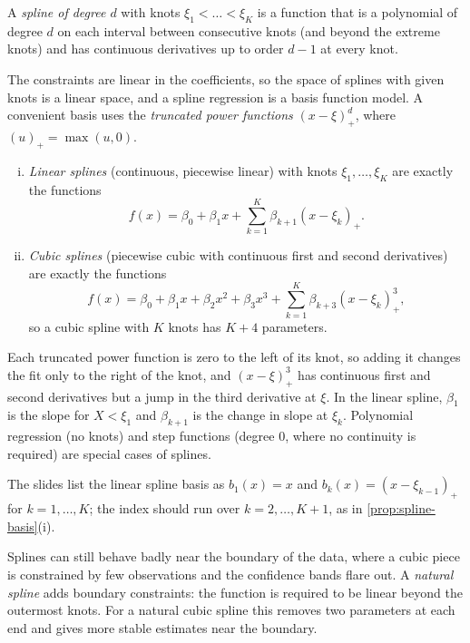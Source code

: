 \begin{definition}[Spline]\label{def:spline}
A \emph{spline of degree $d$} with knots $\xi_1<\dots<\xi_K$ is a function that is a polynomial of degree $d$ on each interval between consecutive knots (and beyond the extreme knots) and has continuous derivatives up to order $d-1$ at every knot.
\end{definition}

The constraints are linear in the coefficients, so the space of splines with given knots is a linear space, and a spline regression is a basis function model. A convenient basis uses the \emph{truncated power functions} $(x-\xi)_+^d$, where $(u)_+=\max(u,0)$.

\begin{proposition}\label{prop:spline-basis}
\leavevmode
\begin{enumerate}[(i)]
  \item \emph{Linear splines} (continuous, piecewise linear) with knots $\xi_1,\dots,\xi_K$ are exactly the functions
  \[
  f(x)=\beta_0+\beta_1x+\sum_{k=1}^K\beta_{k+1}(x-\xi_k)_+ .
  \]
  \item \emph{Cubic splines} (piecewise cubic with continuous first and second derivatives) are exactly the functions
  \[
  f(x)=\beta_0+\beta_1x+\beta_2x^2+\beta_3x^3+\sum_{k=1}^K\beta_{k+3}(x-\xi_k)_+^3 ,
  \]
  so a cubic spline with $K$ knots has $K+4$ parameters.
\end{enumerate}
\end{proposition}

Each truncated power function is zero to the left of its knot, so adding it changes the fit only to the right of the knot, and $(x-\xi)_+^3$ has continuous first and second derivatives but a jump in the third derivative at $\xi$. In the linear spline, $\beta_1$ is the slope for $X<\xi_1$ and $\beta_{k+1}$ is the change in slope at $\xi_k$. Polynomial regression (no knots) and step functions (degree $0$, where no continuity is required) are special cases of splines.

\begin{remark}
The slides list the linear spline basis as $b_1(x)=x$ and $b_k(x)=(x-\xi_{k-1})_+$ for $k=1,\dots,K$; the index should run over $k=2,\dots,K+1$, as in \cref{prop:spline-basis}(i).
\end{remark}

Splines can still behave badly near the boundary of the data, where a cubic piece is constrained by few observations and the confidence bands flare out. A \emph{natural spline} adds boundary constraints: the function is required to be linear beyond the outermost knots. For a natural cubic spline this removes two parameters at each end and gives more stable estimates near the boundary.


